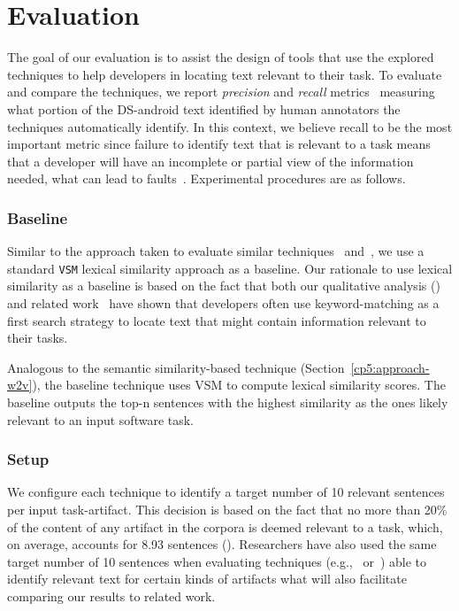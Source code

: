\clearpage

\section{Evaluation}
\label{cp5:evaluation}



The goal of our evaluation is to assist the design of tools that use the explored techniques to help developers in locating text relevant to their task. 
To evaluate and compare the techniques,
we report \textit{precision} and \textit{recall} metrics~\cite{manning2010IR} measuring what portion of the \acs{DS-android} text identified by human annotators the techniques automatically identify.
In this context, we believe recall to be the most important metric since failure to identify text that is relevant to a task means that a developer will have an incomplete or partial view of the information needed,
what can lead to faults~\cite{Murphy2005}.
Experimental procedures are as follows.



\subsubsection{Baseline}


Similar to the approach taken to
evaluate similar techniques~\cite{Lin2021} and~\cite{Ye2016}, we use a standard \texttt{VSM} lexical similarity approach as a baseline. Our rationale to use 
lexical similarity as a baseline is based on the fact that 
both our qualitative analysis () and
related work~\cite{Ko2006a, Freund2015} have shown that developers often use keyword-matching as a first search strategy to locate text that might contain information relevant to their tasks.


Analogous to the semantic similarity-based technique (Section~\ref{cp5:approach-w2v}), the baseline technique uses VSM to compute lexical similarity scores. The baseline outputs the top-n sentences with the highest similarity as the ones likely relevant to an input software task.




\subsubsection{Setup}



We configure each technique to identify a target number of 10 relevant sentences per input task-artifact. 
This decision is based on the fact that no more than 20\% of the content of any artifact in the corpora is deemed relevant to a task, which, on average, accounts for 8.93 sentences ().
Researchers have also used the same target number of 10 sentences when evaluating techniques  (e.g.,~\cite{Xu2017} or~\cite{Lotufo2012}) able to identify relevant text for certain kinds of artifacts what will also facilitate comparing our results to related work.


